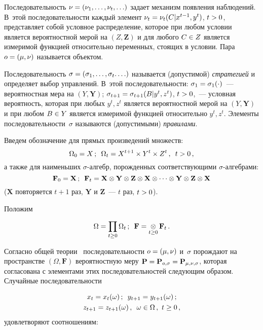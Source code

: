 \begin{multicols}{2}
  Последовательность $\nu\hm=(\nu_1, \ldots , \nu_t, \ldots)$ задает механизм появления 
наблюдений. В~этой последовательности каждый элемент $\nu_t\hm=\nu_t(C\vert x^{t-1}, 
y^t)$, $t\hm>0$, представляет собой условное распределение, которое при любом условии 
является вероятностной мерой на $(Z,\mathbf{Z})$ и для любого $C\hm\in Z$ является 
измеримой функцией относительно переменных, стоящих в условии. Пара $o\hm= 
(\mu,\nu)$ называется объектом.
  
  Последовательность $\sigma\hm= (\sigma_1, \ldots , \sigma_t. \ldots)$ называется 
(допустимой) \textit{стратегией} и определяет выбор управлений. В~этой 
последовательности:
   $\sigma_1\hm=\sigma_1(\cdot)$~--- вероятностная мера на $(Y,\mathbf{Y})$; 
      $\sigma_{t+1}\hm=\sigma_{t+1}(B\vert y^t,z^t)$, $t\hm>0$,~--- условная вероятность, 
которая при любых $y^t,z^t$ является вероятностной мерой на $(Y,\mathbf{Y})$ и при 
любом $B\hm\in Y$ является измеримой функцией относительно $y^t,z^t$. Элементы 
последовательности~$\sigma$ называются (допустимыми) \textit{правилами}.

  
  Введем обозначение для прямых произведений множеств:
  $$
  \Omega_0=X\,;\enskip \Omega_t=X^{t+1}\times Y^t\times Z^t\,,\enskip t>0\,,
  $$
а также для наименьших $\sigma$-ал\-гебр, порожденных соответствующими 
$\sigma$-ал\-геб\-рами:
$$
\mathbf{F}_0=\mathbf{X}\,;\enskip \mathbf{F}_t=\mathbf{X}\otimes \mathbf{Y}\otimes 
\mathbf{Z}\otimes \mathbf{X}\otimes \cdots \otimes \mathbf{Y}\otimes \mathbf{Z}\otimes 
\mathbf{X}
$$
($\mathbf{X}$ повторяется $t+1$ раз, $\mathbf{Y}$ и $\mathbf{Z}$~--- $t$ раз, $t\hm>0$).
  
  Положим
  
  \vspace*{3pt}
  
  \noindent
  $$
  \Omega =\prod\limits_{t\geq 0}\Omega_t\,;\enskip 
\mathbf{F}=\mathop{\otimes}\limits_{t\geq0}\mathbf{F}_t\,.
  $$ 
  
  Согласно общей теории~\cite{3-kon} последовательности $o\hm=(\mu,\nu)$ и~$\sigma$ 
порождают на пространстве $(\Omega, \mathbf{F})$ вероятностную меру $\mathbf{P}\hm= 
\mathbf{P}_{o,\sigma}\hm=\mathbf{P}_{\mu,\nu,\sigma}$, которая согласована с 
элементами этих последовательностей следующим образом. Случайные 
последова\-тель\-ности

\vspace*{-3pt}

\noindent
  \begin{gather*}
  x_t=x_t(\omega)\,;\enskip  
  y_{t+1}=y_{t+1}(\omega)\,;\\
  z_{t+1}= z_{t+1}(\omega)\,,\enskip  \omega\in \Omega\,,\  t\geq 0\,,
  \end{gather*}
удовлетворяют соотношениям:


\end{multicols}
